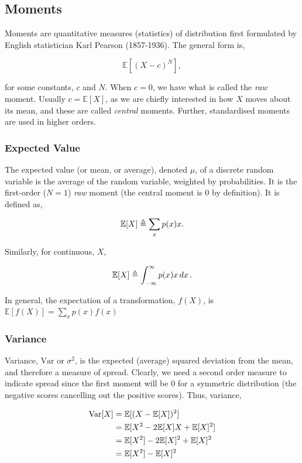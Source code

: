 \documentclass[11pt]{amsart}
\begin{document}
\subsection{Moments}

Moments are quantitative measures (statistics) of distribution first formulated by English statistician Karl Pearson (1857-1936). The general form is,

$$
\mathbb{E}[(X - c)^N],
$$

for some constants, $c$ and $N$. When $c = 0$, we have what is called the \emph{raw} moment. Usually $c = \mathbb{E}[X]$, as we are chiefly interested in how $X$ moves about its mean, and these are called \emph{central} moments. Further, standardised moments are used in higher orders.

\subsubsection{Expected Value}

The expected value (or mean, or average), denoted $\mu$, of a discrete random variable is the average of the random variable, weighted by probabilities. It is the first-order ($N=1$) \emph{raw} moment (the central moment is 0 by definition). It is defined as,

$$
\mathbb{E}[X] \triangleq \sum_{x} p(x) x.\\
$$

Similarly, for continuous, $X$,

$$
\mathbb{E}[X] \triangleq \int_{-\infty}^{\infty} p(x) x \mathop{dx}.\\
$$ 

In general, the expectation of a transformation, $f(X)$, is $\mathbb{E}[f(X)] = \sum_x p(x)f(x)$

\subsubsection{Variance}

Variance, $\text{Var}$ or $\sigma^2$, is the expected (average) squared deviation from the mean, and therefore a measure of spread. Clearly, we need a second order measure to indicate spread since the first moment will be 0 for a symmetric distribution (the negative scores cancelling out the positive scores). Thus, variance,

\begin{align}
\text{Var}[X] &= \mathbb{E}[(X - \mathbb{E}[X])^2] \notag \\
&= \mathbb{E}[X^2 - 2\mathbb{E}[X]X + \mathbb{E}[X]^2] \notag \\
&= \mathbb{E}[X^2] - 2\mathbb{E}[X]^2 + \mathbb{E}[X]^2 \notag \\
&= \mathbb{E}[X^2] - \mathbb{E}[X]^2 \notag
\end{align}
\end{document}
